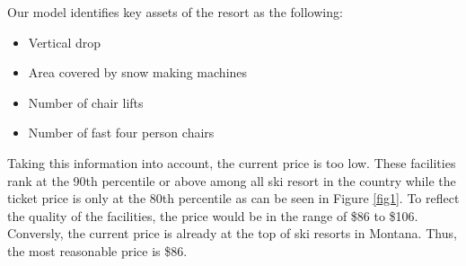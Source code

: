 \documentclass[14pt,a4paper]{extarticle}
\begin{document}
	Our model identifies key assets of the resort as the following:
	\begin{itemize}
		\item Vertical drop
		\item Area covered by snow making machines
		\item Number of chair lifts
		\item Number of fast four person chairs
	\end{itemize}
	Taking this information into account, the current price is too low. These facilities rank at the 90th percentile or above among all ski resort in the country while the ticket price is only at the 80th percentile as can be seen in Figure \ref{fig1}. To reflect the quality of the facilities, the price would be in the range of \$86 to \$106. Conversly, the current price is already at the top of ski resorts in Montana. Thus, the most reasonable price is \$86.  
	
\end{document}
